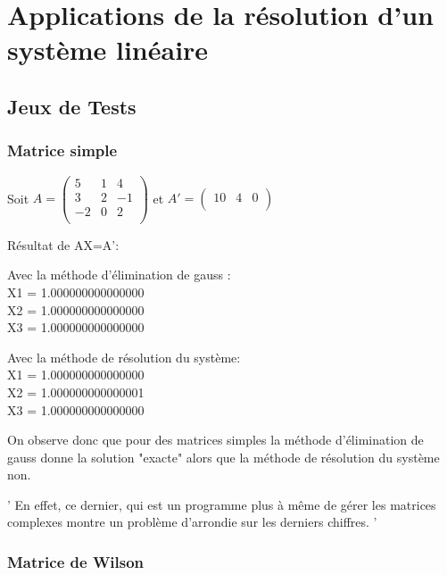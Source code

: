 \documentclass[a4paper,12pt]{report}
\begin{document}
\chapter{Applications de la résolution d'un système linéaire} 
\section{Jeux de Tests}

\subsection{Matrice simple}


\begin{center}
	Soit 
	$A=\begin{pmatrix}
	5&1&4\\
	3&2&-1\\
	-2&0&2\\
	\end{pmatrix}$ 
	et
	$A'=\begin{pmatrix}
	10&4&0\\
	\end{pmatrix}$\\
\end{center}


Résultat de AX=A': 

\begin{center}
	Avec la méthode d'élimination de gauss :\\
	X1 = 1.000000000000000\\
	X2 = 1.000000000000000\\
	X3 = 1.000000000000000\\
\end{center}
\begin{center}
	Avec la méthode de résolution du système:\\
	X1 = 1.000000000000000\\
	X2 = 1.000000000000001\\
	X3 = 1.000000000000000\\
\end{center}


On observe donc que pour des matrices simples  la méthode d'élimination de gauss  donne la solution "exacte" alors que la méthode de résolution du système non. 

'	En effet, ce dernier, qui est un programme plus à même de gérer les matrices complexes montre un problème d'arrondie sur les derniers chiffres.
'

\newpage
\subsection{Matrice de Wilson}
\end{document}
